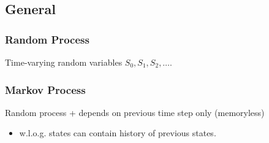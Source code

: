 \subsection{General}
\subsubsection{Random Process}
\begin{definition}
    Time-varying random variables $S_0, S_1, S_2, \ldots$.
\end{definition}

\subsubsection{Markov Process}
\begin{definition}
    Random process + depends on previous time step only (memoryless)
    \begin{itemize}
        \item w.l.o.g. states can contain history of previous states.
    \end{itemize}
\end{definition}

